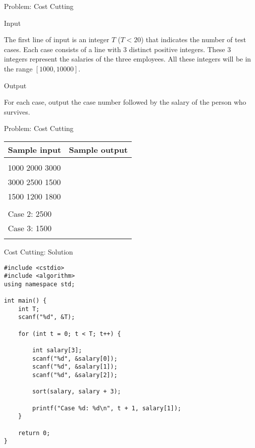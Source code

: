 \documentclass[12pt,t]{beamer}
\begin{document}
\begin{frame}{Problem: Cost Cutting}

    \vspace{20pt}
    {\footnotesize\color{title}Input}

    {\small
       The first line of input is an integer $T$ ($T<20$) that indicates the number of test cases. Each case consists of a line with 3 distinct positive integers. These 3 integers represent the salaries of the three employees. All these integers will be in the range $[1000, 10000]$.
    }


    \vspace{30pt}
    {\footnotesize\color{title}Output}

    {\small
    For each case, output the case number followed by the salary of the person who survives.
    }
\end{frame}

\begin{frame}{Problem: Cost Cutting}
    \vspace{10pt}

    \begin{center}
        \begin{tabular}{|l|l|}
            \hline
            {\footnotesize Sample input} & {\footnotesize Sample output} \\
            \hline
            \begin{minipage}{100pt}
\vspace{10pt}
\ttfamily
3\\
1000 2000 3000\\
3000 2500 1500\\
1500 1200 1800\\
            \end{minipage}
&
\begin{minipage}{100pt}
\vspace{10pt}
\ttfamily
Case 1: 2000\\
Case 2: 2500\\
Case 3: 1500\\
\end{minipage}
\\
            \hline
        \end{tabular}
    \end{center}
\end{frame}


\begin{frame}[fragile]{Cost Cutting: Solution}
    \begin{verbatim}
#include <cstdio>
#include <algorithm>
using namespace std;

int main() {
    int T;
    scanf("%d", &T);

    for (int t = 0; t < T; t++) {

        int salary[3];
        scanf("%d", &salary[0]);
        scanf("%d", &salary[1]);
        scanf("%d", &salary[2]);

        sort(salary, salary + 3);

        printf("Case %d: %d\n", t + 1, salary[1]);
    }

    return 0;
}
\end{verbatim}
\end{frame}
\end{document}
